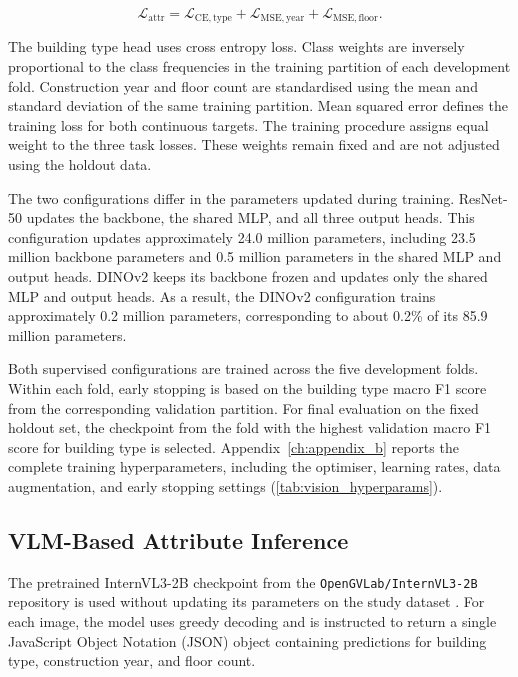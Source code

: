 \begin{equation}
	\label{eq:attr_loss}
	\mathcal{L}_{\mathrm{attr}}
	= \mathcal{L}_{\mathrm{CE,type}}
	+ \mathcal{L}_{\mathrm{MSE,year}}
	+ \mathcal{L}_{\mathrm{MSE,floor}} .
\end{equation}

The building type head uses cross entropy loss.
Class weights are inversely proportional to the class frequencies in the training partition of each development fold.
Construction year and floor count are standardised using the mean and standard deviation of the same training partition.
Mean squared error defines the training loss for both continuous targets.
The training procedure assigns equal weight to the three task losses.
These weights remain fixed and are not adjusted using the holdout data.

The two configurations differ in the parameters updated during training.
ResNet-50 updates the backbone, the shared \ac{MLP}, and all three output heads.
This configuration updates approximately 24.0 million parameters, including 23.5 million backbone parameters and 0.5 million parameters in the shared \ac{MLP} and output heads.
DINOv2 keeps its backbone frozen and updates only the shared \ac{MLP} and output heads.
As a result, the DINOv2 configuration trains approximately 0.2 million parameters, corresponding to about 0.2\% of its 85.9 million parameters.

Both supervised configurations are trained across the five development folds.
Within each fold, early stopping is based on the building type macro F1 score from the corresponding validation partition.
For final evaluation on the fixed holdout set, the checkpoint from the fold with the highest validation macro F1 score for building type is selected.
Appendix~\ref{ch:appendix_b} reports the complete training hyperparameters, including the optimiser, learning rates, data augmentation, and early stopping settings (\cref{tab:vision_hyperparams}).

\subsection{VLM-Based Attribute Inference}
\label{sec:vlm_attribute_inference}

The pretrained InternVL3-2B checkpoint from the \texttt{OpenGVLab/\allowbreak InternVL3-2B} repository is used without updating its parameters on the study dataset \parencite{chen2024}.
For each image, the model uses greedy decoding and is instructed to return a single JavaScript Object Notation (JSON) object containing predictions for building type, construction year, and floor count.


